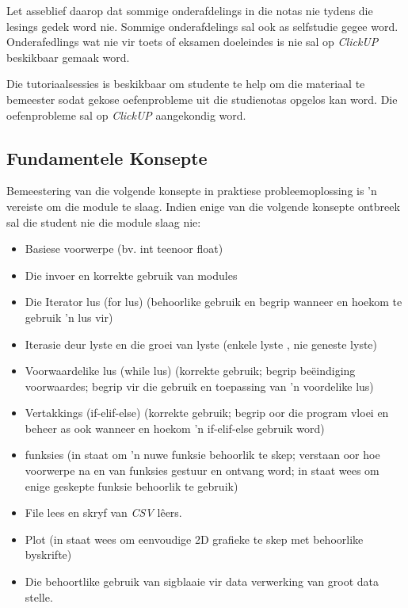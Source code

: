 	Let asseblief daarop dat sommige onderafdelings in die notas nie tydens die lesings
	gedek word nie. Sommige onderafdelings sal ook as selfstudie gegee word.
 	Onderafedlings wat nie vir toets of eksamen doeleindes is nie sal op \textit{ClickUP} beskikbaar 
	gemaak word.

	Die tutoriaalsessies is beskikbaar om studente te help om die materiaal te bemeester sodat 
	gekose oefenprobleme uit die studienotas opgelos kan word. Die oefenprobleme sal op 	   
     	\textit{ClickUP} aangekondig word.	
        
	\subsection{Fundamentele Konsepte}
	Bemeestering van die volgende konsepte in praktiese probleemoplossing is 'n vereiste om die
  	module te slaag. Indien enige
	van die volgende konsepte ontbreek sal die student nie die module slaag nie:

        \begin{itemize}
	\item Basiese voorwerpe (bv. int teenoor float)
            \item Die invoer en korrekte gebruik van modules
            \item Die Iterator lus (for  lus) (behoorlike gebruik en begrip wanneer en hoekom te gebruik
                'n lus vir)
            \item Iterasie deur lyste en die groei van lyste (enkele lyste , nie
                geneste lyste)
            \item Voorwaardelike lus (while lus) (korrekte gebruik; begrip be\"eindiging
                voorwaardes; begrip vir die gebruik en toepassing van 'n voordelike lus)
            \item Vertakkings (if-elif-else) (korrekte gebruik; begrip oor die program vloei en
                beheer as ook wanneer en hoekom 'n if-elif-else gebruik word)
            \item funksies (in staat om 'n nuwe funksie behoorlik te skep; verstaan oor
                hoe voorwerpe na en van funksies gestuur en ontvang word; in staat wees om enige
                geskepte funksie behoorlik te gebruik)
            \item File lees en skryf van \emph{CSV} lêers.
            \item Plot (in staat wees om eenvoudige 2D grafieke te skep met behoorlike
                byskrifte)
            \item Die behoortlike gebruik van sigblaaie vir data verwerking van groot data stelle.
        \end{itemize}
    
